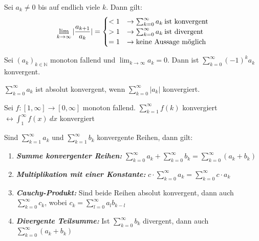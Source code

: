 \documentclass[]{article}
\begin{document}
\begin{satz}[Quotientenkriterium]
	Sei $a_k \neq 0$ bis auf endlich viele $k$. Dann gilt:
	\begin{equation}
		\lim_{k \rightarrow \infty} | \frac{a_{k + 1}}{a_k} | = 
		\begin{cases}
		< 1 & \rightarrow \sum_{k=0}^{\infty} a_k \medspace \textnormal{ist konvergent} \\ 
		> 1 & \rightarrow \sum_{k=0}^{\infty} a_k \medspace \textnormal{ist divergent}  \\
		= 1 & \rightarrow \textnormal{keine Aussage möglich}
		\end{cases}
	\end{equation}
\end{satz}

\begin{satz}[Leibnizkriterium]
	Sei $(a_k)_{k \in \mathbb{N}}$ monoton fallend und $\lim_{k \rightarrow \infty} a_k = 0$. Dann ist $\sum_{k=0}^{\infty} (-1)^k a_k$ konvergent.
\end{satz}

\begin{definition}
	$\sum_{k=0}^{\infty} a_k$ ist absolut konvergent, wenn 	$\sum_{k=0}^{\infty} | a_k | $ konvergiert.
\end{definition}

\begin{satz}[Integralkriterium]
	Sei $f : [1,\infty] \rightarrow [0, \infty]$ monoton fallend. 	$\sum_{k=1}^{\infty} f(k) $ konvergiert $\leftrightarrow \int_{1}^{\infty} f(x) \medspace dx $ konvergiert
\end{satz}

\begin{satz}
	Sind $\sum_{k=1}^{\infty} a_k$ und $\sum_{k=1}^{\infty} b_k$ konvergente Reihen, dann gilt:
	\begin{enumerate}[noitemsep]
		\item \emph{\textbf{Summe konvergenter Reihen:}} $\sum_{k=0}^{\infty} a_k + \sum_{k=0}^{\infty} b_k = \sum_{k=0}^{\infty} (a_k + b_k)$
		\item \emph{\textbf{Multiplikation mit einer Konstante:}} $c \cdot \sum_{k=0}^{\infty} a_k = \sum_{k=0}^{\infty} c \cdot a_k$
		\item \emph{\textbf{Cauchy-Produkt:}} Sind beide Reihen absolut konvergent, dann auch $\sum_{k=0}^{\infty} c_k$, wobei $c_k = \sum_{l=0}^{\infty} a_lb_{k-l}$
		\item \emph{\textbf{Divergente Teilsumme:}}  Ist $\sum_{k=0}^{\infty} b_k$ divergent, dann auch $\sum_{k=0}^{\infty} (a_k + b_k) $
	\end{enumerate}
\end{satz}
\end{document}

